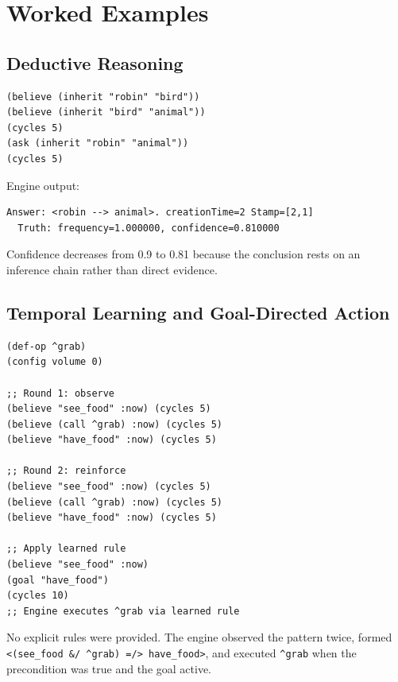 \documentclass[11pt,a4paper]{article}
\begin{document}
\section{Worked Examples}
\label{sec:examples}

\subsection{Deductive Reasoning}

\begin{lstlisting}[language=DriftScript]
(believe (inherit "robin" "bird"))
(believe (inherit "bird" "animal"))
(cycles 5)
(ask (inherit "robin" "animal"))
(cycles 5)
\end{lstlisting}

Engine output:
\begin{lstlisting}[language={},basicstyle=\footnotesize\ttfamily]
Answer: <robin --> animal>. creationTime=2 Stamp=[2,1]
  Truth: frequency=1.000000, confidence=0.810000
\end{lstlisting}

Confidence decreases from 0.9 to 0.81 because the conclusion rests on an
inference chain rather than direct evidence.

\subsection{Temporal Learning and Goal-Directed Action}

\begin{lstlisting}[language=DriftScript]
(def-op ^grab)
(config volume 0)

;; Round 1: observe
(believe "see_food" :now) (cycles 5)
(believe (call ^grab) :now) (cycles 5)
(believe "have_food" :now) (cycles 5)

;; Round 2: reinforce
(believe "see_food" :now) (cycles 5)
(believe (call ^grab) :now) (cycles 5)
(believe "have_food" :now) (cycles 5)

;; Apply learned rule
(believe "see_food" :now)
(goal "have_food")
(cycles 10)
;; Engine executes ^grab via learned rule
\end{lstlisting}

No explicit rules were provided. The engine observed the pattern twice,
formed \texttt{<(see\_food \&/ \^{}grab) =/> have\_food>}, and executed
\texttt{\^{}grab} when the precondition was true and the goal active.
\end{document}
